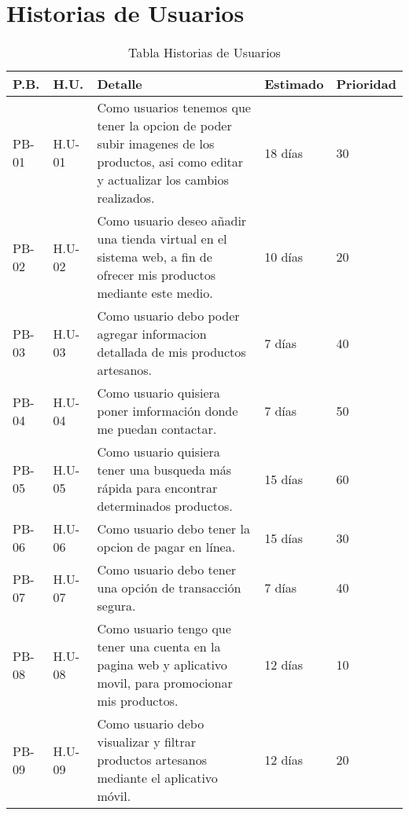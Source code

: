 \chapter{Historias de Usuarios}
\begin{table}
	\begin{center}
		\begin{tabular}{|p{1.5cm}|p{1.5cm}|p{6.5cm}|p{2.5cm}|p{1.5cm}|}
			\hline
			P.B. & H.U. & Detalle & Estimado & Prioridad\\
			\hline \hline
			PB-01 & H.U-01 & Como usuarios tenemos que tener la opcion de poder subir imagenes de los productos, asi como editar y actualizar los cambios realizados.& 18 días  &  30 \\ \hline
			PB-02& H.U-02 & Como usuario deseo añadir una tienda virtual en el sistema web, a fin de ofrecer mis productos mediante este medio.& 10 días &  20 \\ \hline
			PB-03& H.U-03 & Como usuario debo poder agregar informacion detallada de mis productos artesanos.& 7 días &  40 \\ \hline
			PB-04& H.U-04 &Como usuario quisiera poner imformación donde me puedan contactar.& 7 días &  50 \\ \hline
			PB-05& H.U-05 &Como usuario quisiera tener una busqueda más rápida para encontrar determinados productos.& 15 días &  60 \\ \hline
			PB-06& H.U-06 &Como usuario debo tener la opcion de pagar en línea. & 15 días &  30 \\ \hline
			PB-07& H.U-07 &Como usuario debo tener una opción de transacción segura.& 7 días &  40 \\ \hline
			PB-08& H.U-08 &Como usuario tengo que tener una cuenta en la pagina web y aplicativo movil, para promocionar mis productos.& 12 días &  10 \\ \hline
			PB-09& H.U-09 &Como usuario debo visualizar y filtrar productos artesanos mediante el aplicativo móvil. & 12 días &  20 \\ \hline
		\end{tabular}
		\caption{Tabla Historias de Usuarios}
		\label{tabla:sencilla}
	\end{center}
\end{table}

